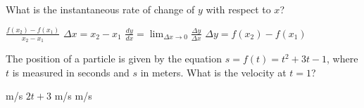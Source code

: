 \documentclass[addpoints, 12pt]{exam}%
\newcommand{\spc}{\vspace*{0.5cm}}
\begin{document}
\begin{questions}
\question[1]

What is the instantaneous rate of change of $y$ with respect to $x$?

\begin{multicols}{2}
\begin{choices}
\choice $\displaystyle\frac{f(x_2) - f(x_1)}{x_2 - x_1}$
\choice $\Delta x = x_2 - x_1$
\CorrectChoice $\displaystyle\frac{dy}{dx} = \lim_{\Delta x \to 0} \frac{\Delta y}{\Delta x}$
\choice $\Delta y = f(x_2) - f(x_1)$
\end{choices}
\end{multicols}

\spc

\question[1]

The position of a particle is given by the equation $s = f(t) = t^2 +3t - 1$, where $t$ is measured in seconds and $s$ in meters. What is the velocity at $t = 1$?

\begin{multicols}{2}
\begin{choices}
 m/s
\choice $2t + 3$
 m/s
 m/s
\end{choices}
\end{multicols}

\end{questions}
\end{document}
